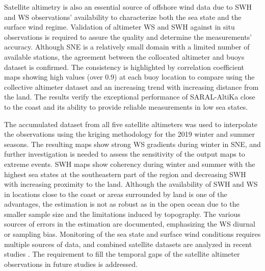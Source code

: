 Satellite altimetry is also an essential source of offshore wind data due to SWH and WS observations' availability to characterize both the sea state and the surface wind regime. Validation of altimeter WS and SWH against in situ observations is required to assure the quality and determine the measurements' accuracy. Although SNE is a relatively small domain with a limited number of available stations, the agreement between the collocated altimeter and buoys dataset is confirmed. The consistency is highlighted by correlation coefficient maps showing high values (over 0.9) at each buoy location to compare using the collective altimeter dataset and an increasing trend with increasing distance from the land. The results verify the exceptional performance of SARAL-AltiKa close to the coast and its ability to provide reliable measurements in low sea states.

The accumulated dataset from all five satellite altimeters was used to interpolate the observations using the kriging methodology for the 2019 winter and summer seasons. The resulting maps show strong WS gradients during winter in SNE, and further investigation is needed to assess the sensitivity of the output maps to extreme events. SWH maps show coherency during winter and summer with the highest sea states at the southeastern part of the region and decreasing SWH with increasing proximity to the land. Although the availability of SWH and WS in locations close to the coast or areas surrounded by land is one of the advantages, the estimation is not as robust as in the open ocean due to the smaller sample size and the limitations induced by topography. The various sources of errors in the estimation are documented, emphasizing the WS diurnal or sampling bias. Monitoring of the sea state and surface wind conditions requires multiple sources of data, and combined satellite datasets are analyzed in recent studies \cite{Hasager2015}. The requirement to fill the temporal gaps of the satellite altimeter observations in future studies is addressed.